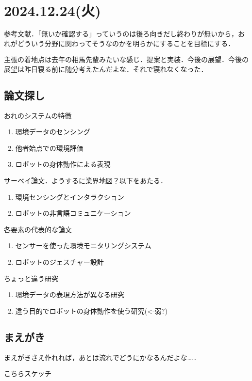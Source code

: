 \documentclass[fleqn,twocolumn]{mynote}
\begin{document}
  \section*{2024.12.24(火)}
  参考文献．「無いか確認する」っていうのは後ろ向きだし終わりが無いから，おれがどういう分野に関わってそうなのかを明らかにすることを目標にする．

  主張の着地点は去年の相馬先輩みたいな感じ．提案と実装．今後の展望．今後の展望は昨日寝る前に随分考えたんだよな．それで寝れなくなった．

  \subsection*{論文探し}
  おれのシステムの特徴
  \begin{enumerate}
    \item 環境データのセンシング
    \item 他者始点での環境評価
    \item ロボットの身体動作による表現
  \end{enumerate}

  サーベイ論文．ようするに業界地図？以下をあたる．
  \begin{enumerate}
    \item 環境センシングとインタラクション
    \item ロボットの非言語コミュニケーション
  \end{enumerate}

  各要素の代表的な論文
  \begin{enumerate}
    \item センサーを使った環境モニタリングシステム
    \item ロボットのジェスチャー設計
  \end{enumerate}

  ちょっと違う研究
  \begin{enumerate}
    \item 環境データの表現方法が異なる研究
    \item 違う目的でロボットの身体動作を使う研究(<-弱?)
  \end{enumerate}

  \subsection*{まえがき}

  まえがきさえ作れれば，あとは流れでどうにかなるんだよな……

  こちらスケッチ
\end{document}
